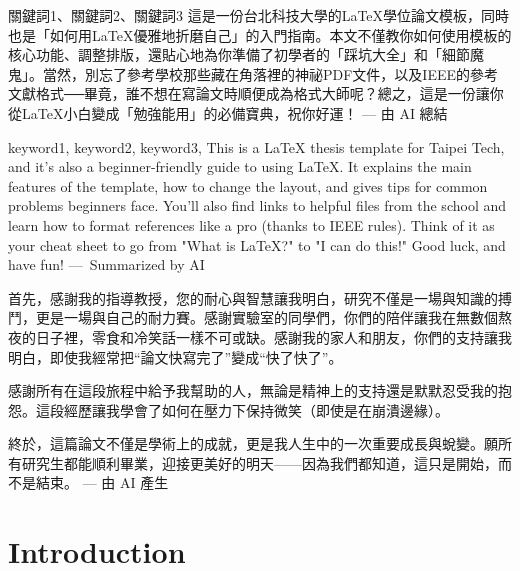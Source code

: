 \documentclass[12pt]{report}
\theoremstyle{plain}
\begin{document}
\makecoverpage

\maketitlepage

\checkresult{} %

\begin{init} %

\begin{abszh}{關鍵詞1、關鍵詞2、關鍵詞3}
這是一份台北科技大學的\LaTeX{}學位論文模板，同時也是「如何用\LaTeX{}優雅地折磨自己」的入門指南。本文不僅教你如何使用模板的核心功能、調整排版，還貼心地為你準備了初學者的「踩坑大全」和「細節魔鬼」。當然，別忘了參考學校那些藏在角落裡的神祕PDF文件，以及IEEE的參考文獻格式──畢竟，誰不想在寫論文時順便成為格式大師呢？總之，這是一份讓你從\LaTeX{}小白變成「勉強能用」的必備寶典，祝你好運！ --- 由 AI 總結
\end{abszh}

\begin{absen}{keyword1, keyword2, keyword3,}
This is a \LaTeX{} thesis template for Taipei Tech, and it’s also a beginner-friendly guide to using \LaTeX{}. It explains the main features of the template, how to change the layout, and gives tips for common problems beginners face. You’ll also find links to helpful files from the school and learn how to format references like a pro (thanks to IEEE rules). Think of it as your cheat sheet to go from "What is \LaTeX{}?" to "I can do this!" Good luck, and have fun! ---~Summarized by AI
\end{absen}

\begin{ack}
首先，感謝我的指導教授，您的耐心與智慧讓我明白，研究不僅是一場與知識的搏鬥，更是一場與自己的耐力賽。感謝實驗室的同學們，你們的陪伴讓我在無數個熬夜的日子裡，零食和冷笑話一樣不可或缺。感謝我的家人和朋友，你們的支持讓我明白，即使我經常把“論文快寫完了”變成“快了快了”。

感謝所有在這段旅程中給予我幫助的人，無論是精神上的支持還是默默忍受我的抱怨。這段經歷讓我學會了如何在壓力下保持微笑（即使是在崩潰邊緣）。

終於，這篇論文不僅是學術上的成就，更是我人生中的一次重要成長與蛻變。願所有研究生都能順利畢業，迎接更美好的明天——因為我們都知道，這只是開始，而不是結束。 --- 由 AI 產生
\end{ack}

\makecontentlists

\end{init}

\chapter{Introduction}
\end{document}
